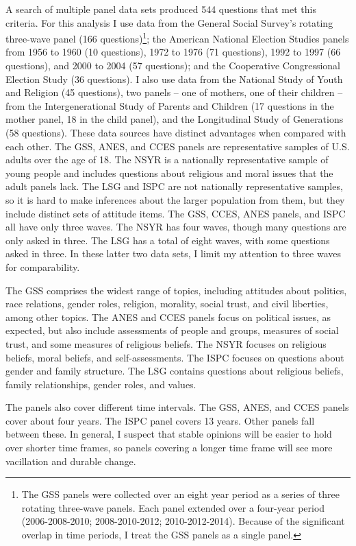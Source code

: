 \documentclass[12pt,]{article}
\begin{document}
A search of multiple panel data sets produced 544 questions that met this criteria. For this analysis I use data from the General Social Survey's rotating three-wave panel (166 questions)\footnote{The GSS panels were collected over an eight year period as a series of three rotating three-wave panels. Each panel extended over a four-year period (2006-2008-2010; 2008-2010-2012; 2010-2012-2014). Because of the significant overlap in time periods, I treat the GSS panels as a single panel.}; the American National Election Studies panels from 1956 to 1960 (10 questions), 1972 to 1976 (71 questions), 1992 to 1997 (66 questions), and 2000 to 2004 (57 questions); and the Cooperative Congressional Election Study (36 questions). I also use data from the National Study of Youth and Religion (45 questions), two panels -- one of mothers, one of their children -- from the Intergenerational Study of Parents and Children (17 questions in the mother panel, 18 in the child panel), and the Longitudinal Study of Generations (58 questions). These data sources have distinct advantages when compared with each other. The GSS, ANES, and CCES panels are representative samples of U.S. adults over the age of 18. The NSYR is a nationally representative sample of young people and includes questions about religious and moral issues that the adult panels lack. The LSG and ISPC are not nationally representative samples, so it is hard to make inferences about the larger population from them, but they include distinct sets of attitude items. The GSS, CCES, ANES panels, and ISPC all have only three waves. The NSYR has four waves, though many questions are only asked in three. The LSG has a total of eight waves, with some questions asked in three. In these latter two data sets, I limit my attention to three waves for comparability.

The GSS comprises the widest range of topics, including attitudes about politics, race relations, gender roles, religion, morality, social trust, and civil liberties, among other topics. The ANES and CCES panels focus on political issues, as expected, but also include assessments of people and groups, measures of social trust, and some measures of religious beliefs. The NSYR focuses on religious beliefs, moral beliefs, and self-assessments. The ISPC focuses on questions about gender and family structure. The LSG contains questions about religious beliefs, family relationships, gender roles, and values.

The panels also cover different time intervals. The GSS, ANES, and CCES panels cover about four years. The ISPC panel covers 13 years. Other panels fall between these. In general, I suspect that stable opinions will be easier to hold over shorter time frames, so panels covering a longer time frame will see more vacillation and durable change.
\end{document}
